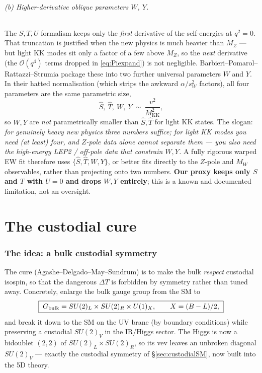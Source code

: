 \documentclass[11pt]{article}
\newcommand{\MKK}{M_{\mathrm{KK}}}
\newcommand{\swsq}{s_W^2}
\newcommand{\SUL}{SU(2)_L}
\newcommand{\SUR}{SU(2)_R}
\newcommand{\UX}{U(1)_X}
\theoremstyle{definition}
\begin{document}
\paragraph{(b) Higher-derivative oblique parameters $W$, $Y$.} The
$S,T,U$ formalism keeps only the \emph{first} derivative of the self-energies at
$q^2=0$. That truncation is justified when the new physics is much heavier than
$M_Z$ --- but light KK modes sit only a factor of a few above $M_Z$, so the
\emph{next} derivative (the $\mathcal{O}(q^4)$ terms dropped in
\eqref{eq:Piexpand}) is not negligible. Barbieri--Pomarol--Rattazzi--Strumia
package these into two further universal parameters $W$ and $Y$. In their
hatted normalisation (which strips the awkward $\alpha/\swsq$ factors), all four
parameters are the same parametric size,
\begin{equation}
\hat S,\ \hat T,\ W,\ Y \ \sim\ \frac{v^2}{\MKK^2},
\end{equation}
so $W,Y$ are \emph{not} parametrically smaller than $\hat S,\hat T$ for light KK
states. The slogan: \emph{for genuinely heavy new physics three numbers suffice;
for light KK modes you need (at least) four, and $Z$-pole data alone cannot
separate them --- you also need the high-energy LEP2 / off-pole data that
constrain $W,Y$.} A fully rigorous warped EW fit therefore uses
$\{\hat S,\hat T,W,Y\}$, or better fits directly to the $Z$-pole and $M_W$
observables, rather than projecting onto two numbers. \textbf{Our proxy keeps
only $S$ and $T$ with $U=0$ and drops $W,Y$ entirely}; this is a known and
documented limitation, not an oversight.

\part{The custodial cure}
\label{part:cust}

\section{The idea: a bulk custodial symmetry}
\label{sec:custidea}

The cure (Agashe--Delgado--May--Sundrum) is to make the bulk \emph{respect}
custodial isospin, so that the dangerous $\Delta T$ is forbidden by symmetry
rather than tuned away. Concretely, enlarge the bulk gauge group from the SM to
\begin{equation}
\boxed{\;G_{\rm bulk} = \SUL \times \SUR \times \UX,\qquad X = (B-L)/2,\;}
\label{eq:custgroup}
\end{equation}
and break it down to the SM on the UV brane (by boundary conditions) while
preserving a custodial $SU(2)_V$ in the IR/Higgs sector. The Higgs is now a
bidoublet $(2,2)$ of $\SUL\times\SUR$, so its vev leaves an unbroken diagonal
$SU(2)_V$ --- exactly the custodial symmetry of \S\ref{sec:custodialSM}, now
built into the 5D theory.
\end{document}
